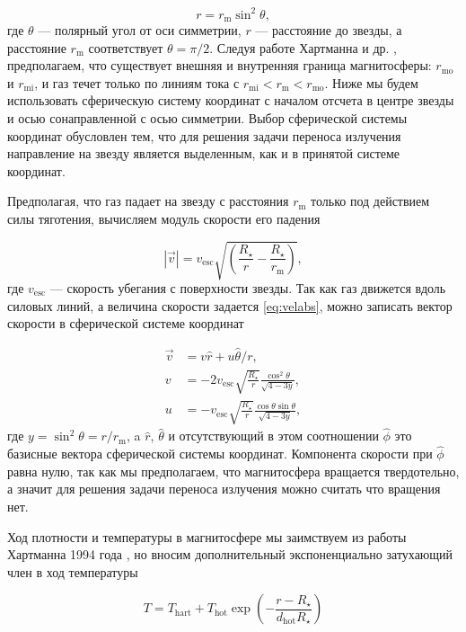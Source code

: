 \documentclass[12pt]{article}
\begin{document}
\begin{equation} \label{eq:dipole}
r = r_\text{m} \sin^2 \theta,
\end{equation}
где $\theta$ --- полярный угол от оси симметрии, $r$ --- расстояние до звезды, а расстояние $r_\text{m}$ соответствует $\theta = \pi/2$. Следуя работе Хартманна и др. \cite{hartmann94}, предполагаем, что существует внешняя и внутренняя граница магнитосферы: $r_\text{mo}$ и $r_\text{mi}$, и газ течет только по линиям тока с $r_\text{mi} < r_\text{m} < r_\text{mo}$. Ниже мы будем использовать сферическую систему координат с началом отсчета в центре звезды и осью сонаправленной с осью симметрии. Выбор сферической системы координат обусловлен тем, что для решения задачи переноса излучения направление на звезду является выделенным, как и в принятой системе координат.

Предполагая, что газ падает на звезду с расстояния $r_\text{m}$ только под действием силы тяготения, вычисляем модуль скорости его падения

\begin{equation} \label{eq:velabs}
|\vec{v}| = v_\text{esc}\sqrt{\left(\frac{R_\star}{r} - \frac{R_\star}{r_\text{m}}\right)},
\end{equation}
где $v_\text{esc}$ --- скорость убегания с поверхности звезды. Так как газ движется вдоль силовых линий, а величина скорости задается \eqref{eq:velabs}, можно записать вектор скорости в сферической системе координат

\begin{align} \label{eq:velvec}
 \vec{v} & = v \hat{r} + u \hat{\theta}/r, \\
 v & = -2v_\text{esc}\sqrt{\frac{R_\star}{r}}\frac{\cos^2\theta}{\sqrt{4-3y}}, \nonumber \\
 u & = -v_\text{esc}\sqrt{\frac{R_\star}{r}}\frac{\cos\theta\sin\theta}{\sqrt{4-3y}}, \nonumber
\end{align}
где $y = \sin^2\theta = r/r_\text{m}$, a $\hat{r}$, $\hat{\theta}$ и отсутствующий в этом соотношении $\hat{\phi}$ это базисные вектора сферической системы координат. Компонента скорости при $\hat{\phi}$ равна нулю, так как мы предполагаем, что магнитосфера вращается твердотельно, а значит для решения задачи переноса излучения можно считать что вращения нет.

Ход плотности и температуры в магнитосфере мы заимствуем из работы Хартманна 1994 года \cite{hartmann94}, но вносим дополнительный экспоненциально затухающий член в ход температуры

\begin{equation} \label{eq:temp}
 T = T_{\text{hart}} + T_\text{hot}\exp\left(-\frac{r - R_\star}{d_\text{hot} R_\star}\right)
\end{equation}
\end{document}
